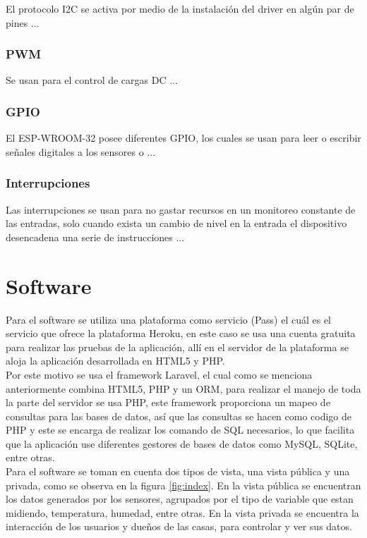 El protocolo I2C se activa por medio de la instalación del driver en algún par de pines ...

\subsubsection{PWM}

Se usan para el control de cargas DC ...

\subsubsection{GPIO}

El ESP-WROOM-32 posee diferentes GPIO, los cuales se usan para leer o escribir señales digitales a los sensores o ...

\subsubsection{Interrupciones}

Las interrupciones se usan para no gastar recursos en un monitoreo constante de las entradas, solo cuando exista un cambio de nivel en la entrada el dispositivo desencadena una serie de instrucciones ...

\section{Software}

Para el software se utiliza una plataforma como servicio (Pass) el cuál es el servicio que ofrece la plataforma Heroku, en este caso se usa una cuenta gratuita para realizar las pruebas de la aplicación, allí en el servidor de la plataforma se aloja la aplicación desarrollada en HTML5 y PHP.\\

Por este motivo se usa el framework Laravel, el cual como se menciona anteriormente combina HTML5, PHP y un ORM, para realizar el manejo de toda la parte del servidor se usa PHP, este framework proporciona un mapeo de consultas para las bases de datos, así que las consultas se hacen como codigo de PHP y este se encarga de realizar los comando de SQL necesarios, lo que facilita que la aplicación use diferentes gestores de bases de datos como MySQL, SQLite, entre otras.\\

Para el software se toman en cuenta dos tipos de vista, una vista pública y una privada, como se observa en la figura \ref{fig:index}. En la vista pública se encuentran los datos generados por los sensores, agrupados por el tipo de variable que estan midiendo, temperatura, humedad, entre otras. En la vista privada se encuentra la interacción de los usuarios y dueños de las casas, para controlar y ver sus datos.\\

